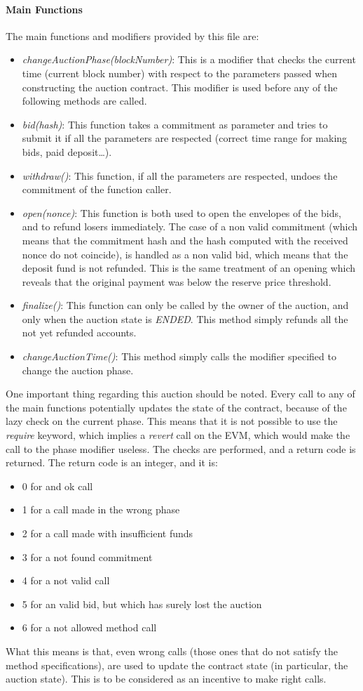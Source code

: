 \documentclass[11pt, a4paper]{report}
\begin{document}
	\paragraph{Main Functions}
	The main functions and modifiers provided by this file are:
	\begin{itemize}
		\item \emph{changeAuctionPhase(blockNumber)}: This is a modifier that checks the current time (current block number) with respect to the parameters passed when constructing the auction contract. This modifier is used before any of the following methods are called.
		\item \emph{bid(hash)}: This function takes a commitment as parameter and tries to submit it if all the parameters are respected (correct time range for making bids, paid deposit\dots).
		\item \emph{withdraw()}: This function, if all the parameters are respected, undoes the commitment of the function caller.  
		\item \emph{open(nonce)}: This function is both used to open the envelopes of the bids, and to refund losers immediately. The case of a non valid commitment (which means that the commitment hash and the hash computed with the received nonce do not coincide), is handled as a non valid bid, which means that the deposit fund is not refunded. This is the same treatment of an opening which reveals that the original payment was below the reserve price threshold.
		\item \emph{finalize()}: This function can only be called by the owner of the auction, and only when the auction state is \emph{ENDED}. This method simply refunds all the not yet refunded accounts.
		\item \emph{changeAuctionTime()}: This method simply calls the modifier specified to change the auction phase.
	\end{itemize}
	One important thing regarding this auction should be noted. Every call to any of the main functions potentially updates the state of the contract, because of the lazy check on the current phase. This means that it is not possible to use the \emph{require} keyword, which implies a \emph{revert} call on the EVM, which would make the call to the phase modifier useless. The checks are performed, and a return code is returned.
	The return code is an integer, and it is:
	\begin{itemize}
		\item 0 for and ok call
		\item 1 for a call made in the wrong phase
		\item 2 for a call made with insufficient funds
		\item 3 for a not found commitment
		\item 4 for a not valid call
		\item 5 for an valid bid, but which has surely lost the auction
		\item 6 for a not allowed method call
	\end{itemize} 
	What this means is that, even wrong calls (those ones that do not satisfy the method specifications), are used to update the contract state (in particular, the auction state). This is to be considered as an incentive to make right calls. 
\end{document}
